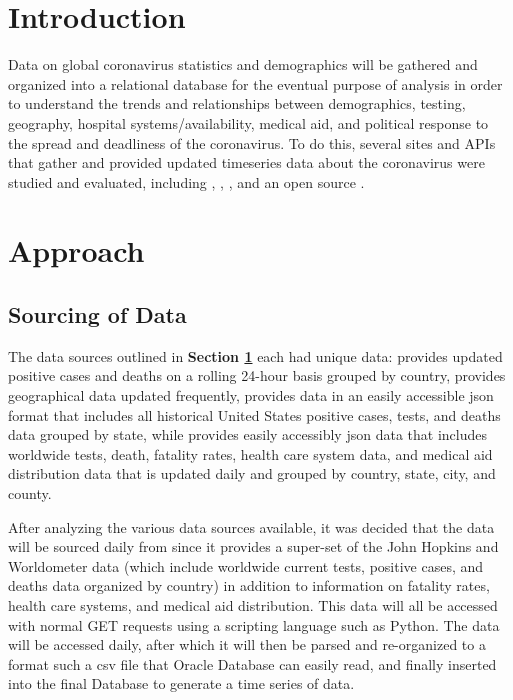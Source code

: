 \documentclass[11pt]{article}
\newcommand{\MYhref}[3][blue]{\href{#2}{\color{#1}{#3}}}%
\begin{document}
\pagebreak

\section{Introduction}
\label{sec:Intro}
\noindent
Data on global coronavirus statistics and demographics will be gathered and organized into a relational database for the eventual purpose of analysis in order to understand the trends and relationships between demographics, testing, geography, hospital systems/availability, medical aid, and political response to the spread and deadliness of the coronavirus. To do this, several sites and APIs that gather and provided updated timeseries data about the coronavirus were studied and evaluated, including \MYhref{https://www.worldometers.info/coronavirus/}{Worldometer}, \MYhref{https://coronavirus.jhu.edu/map.html}{John Hopkins Coronavirus Resource Center}, \MYhref{https://covidtracking.com/api}{The Covid Tracking Project}, and an open source \MYhref{https://www.npmjs.com/package/covid19-api}{Covid-19 API}.

\section{Approach}

\subsection{Sourcing of Data}

\noindent
The data sources outlined in \textbf{Section \ref{sec:Intro}} each had unique data: \MYhref{https://www.worldometers.info/coronavirus/}{Worldometer} provides updated positive cases and deaths on a rolling 24-hour basis grouped by country, \MYhref{https://coronavirus.jhu.edu/map.html}{John Hopkins Coronavirus Resource Center} provides geographical data updated frequently, \MYhref{https://covidtracking.com/api}{The Covid Tracking Project} provides data in an easily accessible json format that includes all historical United States positive cases, tests, and deaths data grouped by state, while \MYhref{https://www.npmjs.com/package/covid19-api}{Covid-19 API} provides easily accessibly json data that includes worldwide tests, death, fatality rates, health care system data, and medical aid distribution data that is updated daily and grouped by country, state, city, and county.

\noindent
After analyzing the various data sources available, it was decided that the data will be sourced daily from \MYhref{https://www.npmjs.com/package/covid19-api}{Covid-19 API} since it provides a super-set of the John Hopkins and Worldometer data (which include worldwide current tests, positive cases, and deaths data organized by country) in addition to information on fatality rates, health care systems, and medical aid distribution. This data will all be accessed with normal GET requests using a scripting language such as Python. The data will be accessed daily, after which it will then be parsed and re-organized to a format such a csv file that Oracle Database can easily read, and finally inserted into the final Database to generate a time series of data.
\end{document}
